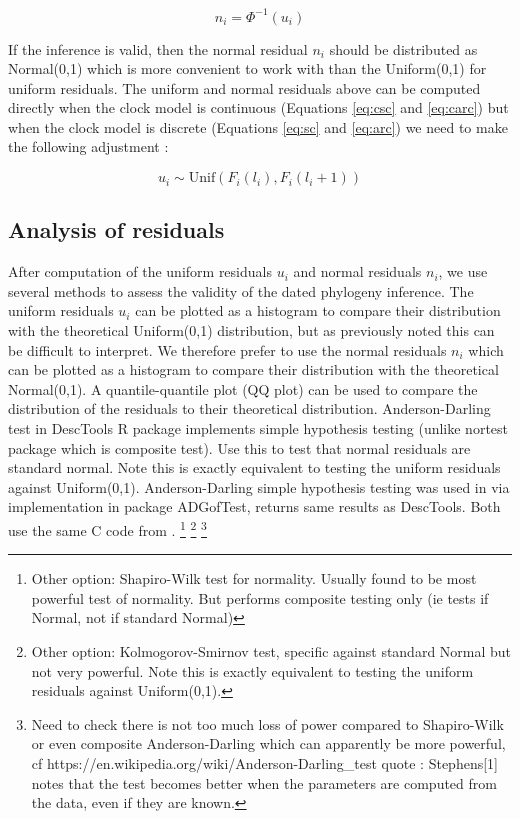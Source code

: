 \documentclass{article}
\begin{document}
\begin{equation}
n_i=\Phi^{-1}(u_i)
\label{eq:norm-resid}
\end{equation}

If the inference is valid, then the normal residual $n_i$ should be distributed
as Normal(0,1) which is more convenient to work with than the Uniform(0,1) for uniform residuals.
The uniform and normal residuals above can be computed directly
when the clock model is continuous (Equations \ref{eq:csc} and \ref{eq:carc}) but when
the clock model is discrete (Equations \ref{eq:sc} and \ref{eq:arc}) we need to make the following
adjustment \citep{dunnRandomizedQuantileResiduals1996,brockwellUniversalResidualsMultivariate2007,lauNewModelDiagnostics2014}:

\begin{equation}
u_i \sim \mathrm{Unif}(F_i(l_i),F_i(l_i+1))
\end{equation}

\subsection*{Analysis of residuals}

After computation of the uniform residuals $u_i$ and normal residuals $n_i$,
we use several methods to assess the validity of the dated phylogeny inference.
The uniform residuals $u_i$ can be plotted as a histogram to compare their
distribution with the theoretical Uniform(0,1) distribution, but as previously noted this can
be difficult to interpret. We therefore prefer to use the normal residuals $n_i$ which can be plotted
as a histogram to compare their distribution with the theoretical Normal(0,1).
A quantile-quantile plot (QQ plot) can be used to compare the distribution of the residuals
to their theoretical distribution.
Anderson-Darling test \citep{lewis1961distribution} 
in DescTools R package implements simple hypothesis testing
(unlike nortest package which is composite test). Use this to test that normal residuals
are standard normal.   
Note this is exactly equivalent to testing the uniform residuals against Uniform(0,1).
Anderson-Darling simple hypothesis testing was used in \citep{lauNewModelDiagnostics2014} via implementation in package ADGofTest, returns same results as DescTools. Both use the same C code from \citep{marsagliaEvaluatingAndersonDarlingDistribution2004}. 
\footnote{Other option: Shapiro-Wilk test for normality. Usually found to be most powerful test of normality. But performs composite testing only (ie tests if Normal, not if standard Normal)}
\footnote{Other option: Kolmogorov-Smirnov test, specific against standard Normal but not very powerful. Note this is exactly equivalent to testing the uniform residuals against Uniform(0,1).}
\footnote{Need to check there is not too much loss of power compared to Shapiro-Wilk or even composite Anderson-Darling which can apparently be more powerful, cf 
https://en.wikipedia.org/wiki/Anderson-Darling\_test quote :
Stephens[1] notes that the test becomes better when the parameters are computed from the data, even if they are known.}
\end{document}
